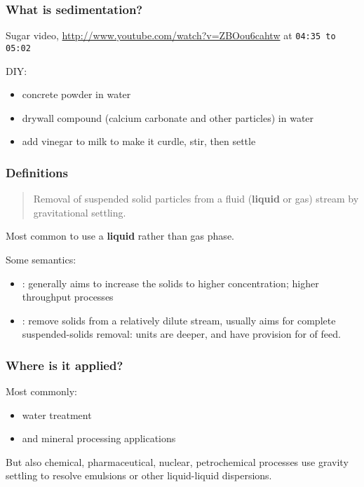 \begin{frame}\frametitle{What is sedimentation?}

	Sugar video, \href{http://www.youtube.com/watch?v=ZBOou6cahtw}{http://www.youtube.com/watch?v=ZBOou6cahtw} at \texttt{04:35 to 05:02}

	\vspace{12pt}
	DIY:
	\begin{itemize}
		\item	concrete powder in water
		\item	drywall compound (calcium carbonate and other particles) in water
		\item	add vinegar to milk to make it curdle, stir, then settle
	\end{itemize}

\end{frame}

\begin{frame}\frametitle{Definitions}
	{}
	\begin{quote}
		Removal of suspended solid particles from a fluid (\textbf{liquid} or gas) stream by gravitational settling.
	\end{quote}
	Most common to use a \textbf{liquid} rather than gas phase.

	\vspace{12pt}
	Some semantics:
	\begin{itemize}
		\item	{\color{purple}{Thickening}}: generally aims to increase the solids to higher concentration; higher throughput processes
		
		\vspace{12pt}
		\item	{\color{purple}{Clarification}}: remove solids from a relatively dilute stream, usually aims for complete suspended-solids removal: units are deeper, and have provision for {\color{purple}{coagulation}} of feed.
	\end{itemize}
\end{frame}

\begin{frame}\frametitle{Where is it applied?}
	Most commonly:
	\begin{itemize}
		\item	water treatment
		\item	and mineral processing applications
	\end{itemize}

	\vspace{12pt}
	But also chemical, pharmaceutical, nuclear, petrochemical processes use gravity settling to resolve emulsions or other liquid-liquid dispersions. 
\end{frame}

